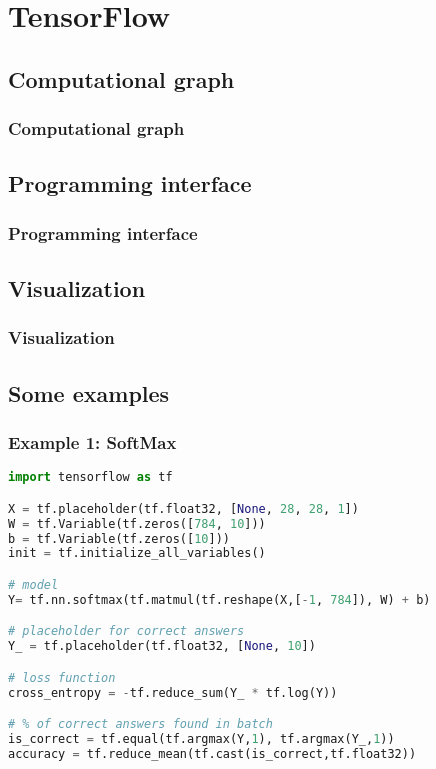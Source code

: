 
\section{TensorFlow}\label{sec:TF}

\subsection{Computational graph}

\begin{frame}
  \MyLogo
  \frametitle{Computational graph}  

\end{frame}

\subsection{Programming interface}

\begin{frame}
  \MyLogo
  \frametitle{Programming interface}  

\end{frame}

\subsection{Visualization}

\begin{frame}
  \MyLogo
  \frametitle{Visualization}  

\end{frame}

\subsection{Some examples}

\begin{frame}[fragile]
  \MyLogo
  \frametitle{Example 1: SoftMax}  
 
\scriptsize{
\begin{lstlisting}[language=python]
import tensorflow as tf    

X = tf.placeholder(tf.float32, [None, 28, 28, 1])     
W = tf.Variable(tf.zeros([784, 10]))    
b = tf.Variable(tf.zeros([10]))   
init = tf.initialize_all_variables() 

# model
Y= tf.nn.softmax(tf.matmul(tf.reshape(X,[-1, 784]), W) + b)  

# placeholder for correct answers    
Y_ = tf.placeholder(tf.float32, [None, 10])  

# loss function   
cross_entropy = -tf.reduce_sum(Y_ * tf.log(Y))  

# % of correct answers found in batch
is_correct = tf.equal(tf.argmax(Y,1), tf.argmax(Y_,1))  
accuracy = tf.reduce_mean(tf.cast(is_correct,tf.float32))  
\end{lstlisting}
}

\end{frame}

